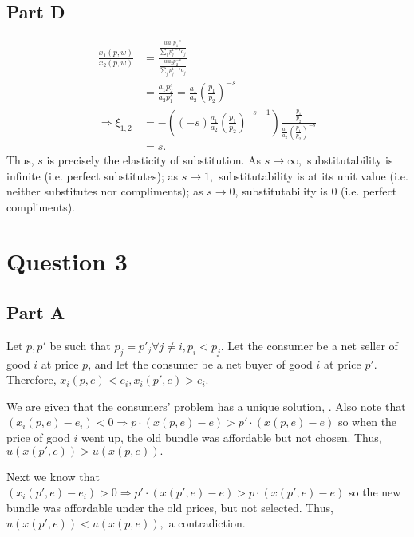 \documentclass[11pt]{article} %
\begin{document}
\subsection{Part D}
\begin{align*}
\frac{x_1(p,w)}{x_2(p,w)} &= \frac{ \frac{w a_1 p_1^{-s}}{\sum_j p_j^{1-s}a_j}}{ \frac{w a_2 p_2^{-s}}{\sum_j p_j^{1-s}a_j}} \\
&=\frac{a_1p_2^s}{a_2p_1^s} = \frac{a_1}{a_2}\left( \frac{p_1}{p_2}\right)^{-s}\\
\Rightarrow \xi_{1,2} &=  -\left((-s) \frac{a_1}{a_2}  \left( \frac{p_1}{p_2}\right)^{-s-1}\right) \frac{\frac{p_1}{p_2}}{ \frac{a_1}{a_2}\left( \frac{p_1}{p_2}\right)^{-s}}\\
&= s.
\end{align*}
Thus, $s$ is precisely the elasticity of substitution. As $s\rightarrow \infty,$ substitutability is infinite (i.e. perfect substitutes); as $s\rightarrow 1,$ substitutability is at its unit value (i.e. neither substitutes nor compliments); as $s\rightarrow 0$, substitutability is $0$ (i.e. perfect compliments).

\section{Question 3}
\subsection{Part A}
Let $p,p'$ be such that $p_j = p'_j \forall j\neq i, p_i<p_j.$ Let the consumer be a net seller of good $i$ at price $p$, and let the consumer be a net buyer of good $i$ at price $p'$. Therefore, $x_i(p,e)<e_i, x_i(p',e)>e_i.$

We are given that the consumers' problem has a unique solution, . Also note that $ (x_i(p,e) - e_i)<0 \Rightarrow p\cdot (x(p,e)-e) > p'\cdot (x(p,e)-e) $ so when the price of good $i$ went up, the old bundle was affordable but not chosen. Thus, $u(x(p',e))>u(x(p,e)).$

Next we know that $ (x_i(p',e) - e_i)>0 \Rightarrow  p' \cdot (x(p',e)-e) > p \cdot (x(p',e)-e) $ so the new bundle was affordable under the old prices, but not selected. Thus, $u(x(p',e))<u(x(p,e)),$ a contradiction.
\end{document}
